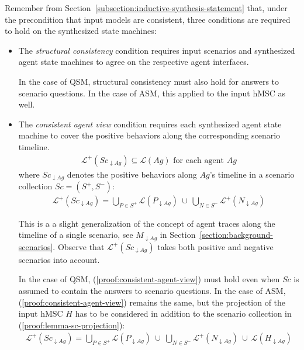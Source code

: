 Remember from Section~\ref{subsection:inductive-synthesis-statement} that, under the precondition that input models are consistent, three conditions are required to hold on the synthesized state machines:
\begin{itemize}
\item The \emph{structural consistency} condition requires input scenarios and synthesized agent state machines to agree on the respective agent interfaces. 

In the case of QSM, structural consistency must also hold for answers to scenario questions. In the case of ASM, this applied to the input hMSC as well.

\item The \emph{consistent agent view} condition requires each synthesized agent state machine to cover the positive behaviors along the corresponding scenario timeline.
\begin{align}
\mathcal{L}^+(Sc_{\downarrow Ag}) \subseteq \mathcal{L}(Ag)\mbox{~for each agent $Ag$}\label{proof:consistent-agent-view}
\end{align}
where $Sc_{\downarrow Ag}$ denotes the positive behaviors along $Ag$'s timeline in a scenario collection $Sc = (S^+, S^-)$:
\begin{align}
\mathcal{L}^+(Sc_{\downarrow Ag}) = \bigcup_{P \in S^+} \mathcal{L}(P_{\downarrow Ag})~\cup~\bigcup_{N \in S^{-}} \mathcal{L}^{+}(N_{\downarrow Ag})\label{proof:lemma-sc-projection}
\end{align}

This is a a slight generalization of the concept of agent traces along the timeline of a single scenario, see $M_{\downarrow Ag}$ in Section~\ref{section:background-scenarios}. Observe that $\mathcal{L}^+(Sc_{\downarrow Ag})$ takes both positive and negative scenarios into account.

In the case of QSM, (\ref{proof:consistent-agent-view}) must hold even when $Sc$ is assumed to contain the answers to scenario questions. In the case of ASM, (\ref{proof:consistent-agent-view}) remains the same, but the projection of the input hMSC $H$ has to be considered in addition to the scenario collection in (\ref{proof:lemma-sc-projection}):
\begin{align}
\mathcal{L}^+(Sc_{\downarrow Ag}) = \bigcup_{P \in S^+} \mathcal{L}(P_{\downarrow Ag})~\cup~\bigcup_{N \in S^{-}} \mathcal{L}^{+}(N_{\downarrow Ag})~\cup~\mathcal{L}(H_{\downarrow Ag})\label{proof:lemma-sc-projection-asm}
\end{align}


\end{itemize}
